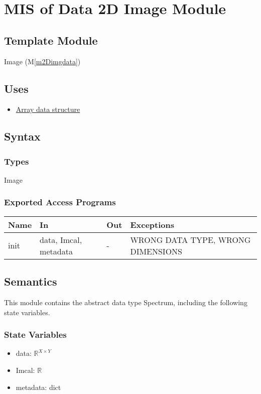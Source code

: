 \documentclass[12pt, titlepage]{article}
\newcommand{\mref}[1]{M\ref{#1}}
\begin{document}
\section{MIS of Data 2D Image Module} \label{Mod:Image}

\subsection{Template Module}
Image (\mref{m2Dimgdata})

\subsection{Uses}
\begin{itemize}
    \item \hyperref[Mod:Array]{Array data structure}
\end{itemize}

\subsection{Syntax}
\subsubsection{Types}
Image

\subsubsection{Exported Access Programs}

\begin{center}
    \begin{tabular}{p{1.5cm} p{4cm} p{4cm} p{4cm}}
        \toprule
        \textbf{Name} & \textbf{In} & \textbf{Out} & \textbf{Exceptions} \\
        \midrule
        init & data, Imcal, metadata & - & WRONG DATA TYPE, WRONG DIMENSIONS \\
        \bottomrule
    \end{tabular}
\end{center}

\subsection{Semantics}
This module contains the abstract data type Spectrum, including the following
state variables.
\subsubsection{State Variables}
\begin{itemize}
    \item data: $\mathbb{R}^{X \times Y}$
    \item Imcal: $\mathbb{R}$
    \item metadata: dict
\end{itemize}
\end{document}
